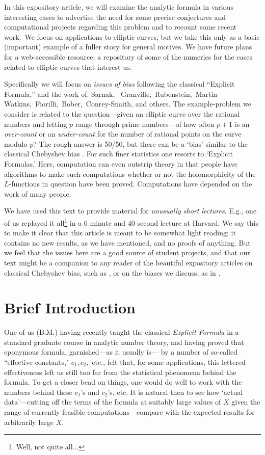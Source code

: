 \documentclass[11pt]{article}
\theoremstyle{plain}
\theoremstyle{definition}
\numberwithin{equation}{section}
\numberwithin{figure}{section}
\numberwithin{table}{section}
\begin{document}
   In this expository article, we will examine the analytic formula in various interesting cases to advertise the need for some  precise conjectures and computational projects regarding this problem and to recount some recent work.\  We focus on applications to elliptic curves, but we take this only as a basic (important) example of a fuller story for general motives.  We have  future plans for a web-accessible resource: a repository of some of the numerics for the cases related to elliptic curves that interest us.

  Specifically we will  focus on {\it issues of bias}  following the classical ``Explicit Formula,'' and the work of:
Sarnak, \ Granville,\  Rubenstein,\, Martin-Watkins,\ Fiorilli,\ Bober,\ Conrey-Snaith, and others.
 The example-problem we consider is related to the question---given an elliptic curve over the rational numbers and letting  $p$ range through prime numbers---of how often  $p+1$ is an {\it over-count} or an {\it under-count} for the number of rational points on the curve modulo $p$? The rough answer is 50/50, but there can be a `bias' similar to the classical Chebyshev bias  \cite{R-S}. For such finer statistics one resorts to `Explicit Formulas.'  Here, computation can even outstrip theory in that people have algorithms to make such computations whether or not the holomorphicity of the $L$-functions in question have been proved. Computations have depended on the work of many people.


 We have used this text to provide material for {\it unusually short lectures}. %
 E.g., one of us replayed it all{\footnote{ Well, not quite all$\dots$}} in a 6 minute and 40 second lecture at Harvard. We say this to make it clear that this article is meant to be  somewhat light reading; it contains no new results, as we have mentioned, and no proofs of anything. But we feel that the issues here are a good source of student projects, and that our text might be  a companion to any reader of the beautiful expository articles on classical Chebyshev bias, such as \cite{R-S}, or on the biases we discuss, as in \cite{S}.

\hskip20pt{\small{\tableofcontents}}

\section{Brief Introduction}
 One of us (B.M.) having recently taught the classical {\it Explicit Formula} in a standard graduate course in analytic number theory, and having proved that eponymous formula, garnished---as it usually is--- by a number of so-called ``effective constants," $c_1, c_2,$ etc., felt  that, for some applications, this lettered effectiveness left us still too far from  the statistical phenomena behind the formula. To get a closer bead on things, one would do well to work with the numbers behind these   $c_1$'s and $c_2$'s, etc.  It is natural then to see how `actual data'---cutting off the terms of the formula at suitably large values of $X$ given the range of currently feasible computations---compare with the expected results for arbitrarily large $X$.
\end{document}
